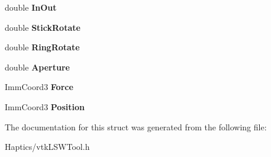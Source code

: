 \begin{DoxyCompactItemize}
\item 
\hypertarget{structvtkLSWDataTool_a6761ea9113b6def7f65e31420603a906}{
double {\bfseries InOut}}
\label{structvtkLSWDataTool_a6761ea9113b6def7f65e31420603a906}

\item 
\hypertarget{structvtkLSWDataTool_a43800f23a0365fe72a6d45aa6bd49388}{
double {\bfseries StickRotate}}
\label{structvtkLSWDataTool_a43800f23a0365fe72a6d45aa6bd49388}

\item 
\hypertarget{structvtkLSWDataTool_a1c56015f4a2757b0b9fc313a57f58962}{
double {\bfseries RingRotate}}
\label{structvtkLSWDataTool_a1c56015f4a2757b0b9fc313a57f58962}

\item 
\hypertarget{structvtkLSWDataTool_a72d7e48f75dd6b3ac922b00c37cb185a}{
double {\bfseries Aperture}}
\label{structvtkLSWDataTool_a72d7e48f75dd6b3ac922b00c37cb185a}

\item 
\hypertarget{structvtkLSWDataTool_a75485de999decec27f625fa0182e1723}{
ImmCoord3 {\bfseries Force}}
\label{structvtkLSWDataTool_a75485de999decec27f625fa0182e1723}

\item 
\hypertarget{structvtkLSWDataTool_ad6f2ed43866f2bde17079ac1f35824ce}{
ImmCoord3 {\bfseries Position}}
\label{structvtkLSWDataTool_ad6f2ed43866f2bde17079ac1f35824ce}

\end{DoxyCompactItemize}


The documentation for this struct was generated from the following file:\begin{DoxyCompactItemize}
\item 
Haptics/vtkLSWTool.h\end{DoxyCompactItemize}
